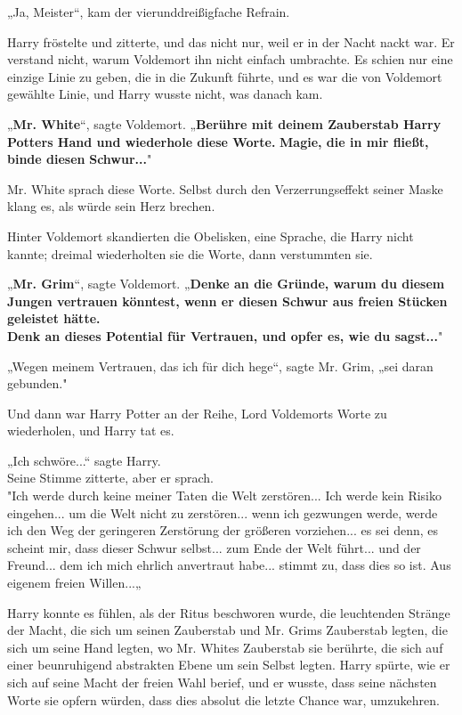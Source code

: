 {„Ja, Meister“, kam der vierunddreißigfache Refrain.

Harry fröstelte und zitterte, und das nicht nur, weil er in der Nacht nackt war. Er verstand nicht, warum Voldemort ihn nicht einfach umbrachte. Es schien nur eine einzige Linie zu geben, die in die Zukunft führte, und es war die von Voldemort gewählte Linie, und Harry wusste nicht, was danach kam.

„\textbf{Mr. White}“, sagte Voldemort. „\textbf{Berühre mit deinem Zauberstab Harry Potters Hand und wiederhole diese Worte.} \textbf{Magie, die in mir fließt, binde diesen} \textbf{Schwur...}"

Mr. White sprach diese Worte. Selbst durch den Verzerrungseffekt seiner Maske klang es, als würde sein Herz brechen.

Hinter Voldemort skandierten die Obelisken, eine Sprache, die Harry nicht kannte; dreimal wiederholten sie die Worte, dann verstummten sie.

„\textbf{Mr. Grim}“, sagte Voldemort. „\textbf{Denke an die Gründe, warum du diesem Jungen vertrauen könntest, wenn er diesen Schwur aus freien Stücken geleistet hätte.\\ Denk an dieses Potential für Vertrauen, und opfer es, wie du sagst...}"

„Wegen meinem Vertrauen, das ich für dich hege“, sagte Mr. Grim, „sei daran gebunden."

Und dann war Harry Potter an der Reihe, Lord Voldemorts Worte zu wiederholen, und Harry tat es.

„Ich schwöre...“ sagte Harry.\\ Seine Stimme zitterte, aber er sprach.\\ "Ich werde durch keine meiner Taten die Welt zerstören... Ich werde kein Risiko eingehen... um die Welt nicht zu zerstören... wenn ich gezwungen werde, werde ich den Weg der geringeren Zerstörung der größeren vorziehen... es sei denn, es scheint mir, dass dieser Schwur selbst... zum Ende der Welt führt... und der Freund... dem ich mich ehrlich anvertraut habe... stimmt zu, dass dies so ist. Aus eigenem freien Willen...„

Harry konnte es fühlen, als der Ritus beschworen wurde, die leuchtenden Stränge der Macht, die sich um seinen Zauberstab und Mr. Grims Zauberstab legten, die sich um seine Hand legten, wo Mr. Whites Zauberstab sie berührte, die sich auf einer beunruhigend abstrakten Ebene um sein Selbst legten. Harry spürte, wie er sich auf seine Macht der freien Wahl berief, und er wusste, dass seine nächsten Worte sie opfern würden, dass dies absolut die letzte Chance war, umzukehren.

}
